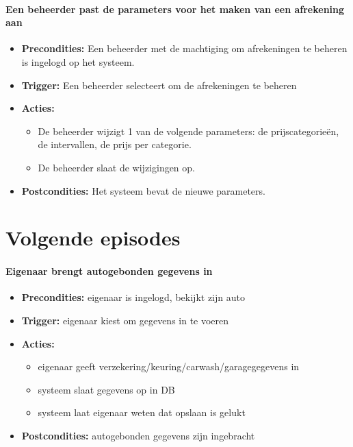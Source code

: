 \documentclass[]{article}
\begin{document}
\subsection{Een beheerder past de parameters voor het maken van een afrekening aan}
\begin{itemize}
\item \textbf{Precondities:} Een beheerder met de machtiging om afrekeningen te beheren is ingelogd op het systeem.
\item \textbf{Trigger:} Een beheerder selecteert om de afrekeningen te beheren
\item \textbf{Acties:} 
\begin{itemize}
	\item	De beheerder wijzigt 1 van de volgende parameters: de prijscategorie\"{e}n, de intervallen, de prijs per categorie.
	\item	De beheerder slaat de wijzigingen op.
\end{itemize}
\item \textbf{Postcondities:} Het systeem bevat de nieuwe parameters.
\end{itemize}


\part{Volgende episodes}
\subsection{Eigenaar brengt autogebonden gegevens in}
\begin{itemize}
\item \textbf{Precondities:} eigenaar is ingelogd, bekijkt zijn auto
\item \textbf{Trigger:} eigenaar kiest om gegevens in te voeren
\item \textbf{Acties:} \begin{itemize}
\item	eigenaar geeft verzekering/keuring/carwash/garagegegevens in
\item	systeem slaat gegevens op in DB
\item      systeem laat eigenaar weten dat opslaan is gelukt
\end{itemize}
\item \textbf{Postcondities:} autogebonden gegevens zijn ingebracht
\end{itemize}
\end{document}
